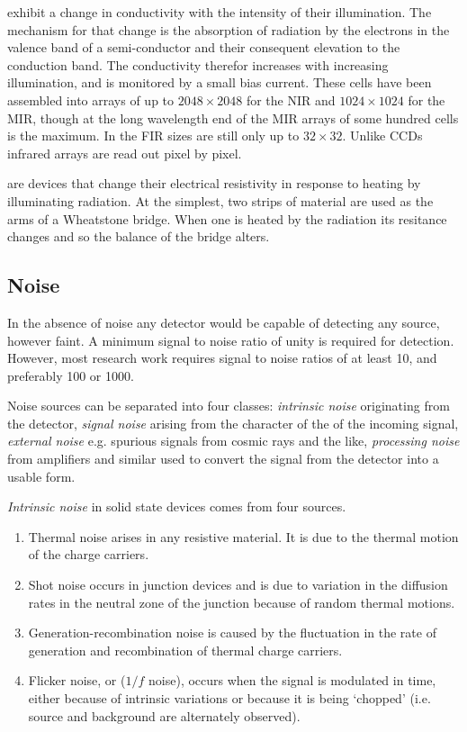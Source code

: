 \documentclass{article}
\begin{document}
 exhibit a change in conductivity with the 
intensity of their illumination. The mechanism for that change is the 
absorption of radiation by the electrons in the valence band of a 
semi-conductor and their consequent elevation to the conduction band. The
conductivity therefor increases with increasing illumination, and is monitored
by a small bias current. These cells have been assembled into arrays of 
up to $2048\times 2048$ for the NIR and $1024\times 1024$ for the MIR, 
though at the long wavelength end of the MIR arrays of some hundred cells is
the maximum. In the FIR sizes are still only up to $32\times 32$. Unlike
CCDs infrared arrays are read out pixel by pixel. 

 are devices that change their electrical
resistivity in response to heating by illuminating radiation. At the
simplest, two strips of material are used as the arms of a Wheatstone
bridge. When one is heated by the radiation its resitance changes and
so the balance of the bridge alters. 

\subsection*{Noise}

In the absence of noise any detector would be capable of detecting any source,
however faint. A minimum signal to noise ratio of unity is required for 
detection. However, most research work requires signal to noise ratios of
at least 10, and preferably 100 or 1000. 

Noise sources can be separated into four classes: {\it intrinsic noise} 
originating from the detector, {\it signal noise} arising from the character
of the of the incoming signal, {\it external noise} e.g. spurious signals
from cosmic rays and the like, {\it processing noise} from amplifiers and
similar used to convert the signal from the detector into a usable form.

{\it Intrinsic noise} in solid state devices comes from four sources.
\begin{enumerate}
\item Thermal noise arises in any resistive material. It is due to the thermal
motion of the charge carriers. 
\item Shot noise occurs in junction devices and is due to variation in 
the diffusion rates in the neutral zone of the junction because of random
thermal motions. 
\item Generation-recombination noise is caused by the fluctuation in the
rate of generation and recombination of thermal charge carriers. 
\item Flicker noise, or ($1/f$ noise), occurs when the signal is modulated
in time, either because of intrinsic variations or because it is being
`chopped' (i.e. source and background are alternately observed). 
\end{enumerate}
\end{document}
